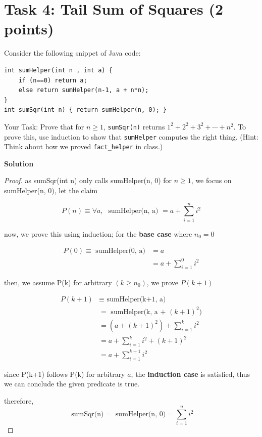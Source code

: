 \documentclass{article}
\newcommand{\solution}{\textbf{\large Solution}}
\theoremstyle{remark}
\begin{document}
\newpage 

\section*{Task 4: Tail Sum of Squares (2 points)}

Consider the following snippet of Java code:
\begin{verbatim}
int sumHelper(int n , int a) {
    if (n==0) return a;
    else return sumHelper(n-1, a + n*n);
}
int sumSqr(int n) { return sumHelper(n, 0); }
\end{verbatim}

Your Task: Prove that for $n \ge 1$, \texttt{sumSqr(n)} returns $1^2 + 2^2 + 3^2 + \cdots + n^2$. To prove this, use induction to show that \texttt{sumHelper} computes the right thing. (Hint: Think about how we proved \texttt{fact\_helper} in class.)

\medskip
\solution

\begin{proof}
as sumSqr(int n) only calls sumHelper(n, 0) for $n \ge 1$, we focus on sumHelper(n, 0), let the claim

\[
P(n) \equiv \forall a,\; \text{ sumHelper(n, a) } = a + \sum_{i=1}^n i^2
\]

now, we prove this using induction; for the \textbf{base case} where $n_0 = 0$

\begin{align*}
    P(0) \equiv \text{ sumHelper(0, a)} 
    &= a \\
    &= a + \sum_{i=1}^{0} i^2
\end{align*}

then, we assume P(k) for arbitrary $(k \ge n_0)$, we prove $P(k+1)$

\begin{align*}
    P(k+1) &\equiv \text{ sumHelper(k+1, a)} \\
    &= \text{ sumHelper(k, a + $(k+1)^2)$} \\
    &= (a + (k+1)^2) + \sum_{i=1}^{k} i^2 \\
    &= a + \sum_{i=1}^{k} i^2 + (k+1)^2 \\
    &= a + \sum_{i=1}^{k+1} i^2
\end{align*}

since P(k+1) follows P(k) for arbitrary $a$, the \textbf{induction case} is satisfied, thus we can conclude the given predicate is true.

therefore, 
\[
\text{ sumSqr(n)} = \text{ sumHelper(n, 0)} = \sum_{i=1}^{n} i^2
\]

\end{proof}
\end{document}
